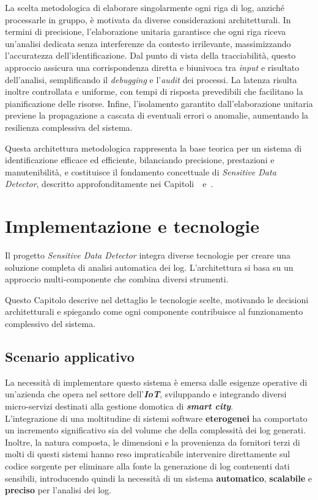 \documentclass[12pt,twoside]{report}
\begin{document}
La scelta metodologica di elaborare singolarmente ogni riga di log, anziché processarle in gruppo, è motivata da diverse considerazioni architetturali. In termini di precisione, l'elaborazione unitaria garantisce che ogni riga riceva un'analisi dedicata senza interferenze da contesto irrilevante, massimizzando l'accuratezza dell'identificazione. Dal punto di vista della tracciabilità, questo approccio assicura una corrispondenza diretta e biunivoca tra \textit{input} e risultato dell'analisi, semplificando il \textit{debugging} e l'\textit{audit} dei processi. La latenza risulta inoltre controllata e uniforme, con tempi di risposta prevedibili che facilitano la pianificazione delle risorse. Infine, l'isolamento garantito dall'elaborazione unitaria previene la propagazione a cascata di eventuali errori o anomalie, aumentando la resilienza complessiva del sistema.

Questa architettura metodologica rappresenta la base teorica per un sistema di identificazione efficace ed efficiente, bilanciando precisione, prestazioni e manutenibilità, e costituisce il fondamento concettuale di \textit{Sensitive Data Detector}, descritto approfonditamente nei Capitoli~~e~.


%
%

\cleardoublepage
\chapter{Implementazione e tecnologie}
\label{chap:implementazione_tecnologie}

Il progetto \textit{Sensitive Data Detector} integra diverse tecnologie per creare una soluzione completa di analisi automatica dei log. L'architettura si basa su un approccio multi-componente che combina diversi strumenti.

Questo Capitolo descrive nel dettaglio le tecnologie scelte, motivando le decisioni architetturali e spiegando come ogni componente contribuisce al funzionamento complessivo del sistema.

\section{Scenario applicativo}
\label{sec:scenario_applicativo}
La necessità di implementare questo sistema è emersa dalle esigenze operative di un'azienda che opera nel settore dell'\textbf{\textit{IoT}}, sviluppando e integrando diversi micro-servizi destinati alla gestione domotica di \textbf{\textit{smart city}}.\\
L'integrazione di una moltitudine di sistemi software \textbf{eterogenei} ha comportato un incremento significativo sia del volume che della complessità dei log generati.\\
Inoltre, la natura composta, le dimensioni e la provenienza da fornitori terzi di molti di questi sistemi hanno reso impraticabile intervenire direttamente sul codice sorgente per eliminare alla fonte la generazione di log contenenti dati sensibili, introducendo quindi la necessità di un sistema \textbf{automatico}, \textbf{scalabile} e \textbf{preciso} per l'analisi dei log.
\end{document}

